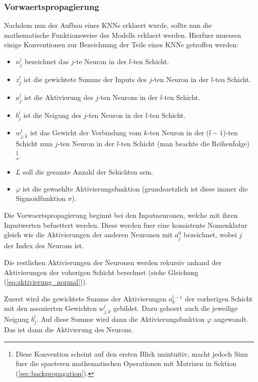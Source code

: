 \documentclass[../main]{subfiles}
\begin{document}
\subsubsection{Vorwaertspropagierung}
Nachdem nun der Aufbau eines KNNs erklaert wurde, sollte nun die mathematische Funktionsweise
des Modells erklaert werden. Hierfuer muessen einige Konventionen zur
Bezeichnung der Teile eines KNNs getroffen werden:
\begin{itemize}

\item{$n_j^l$ bezeichnet das $j$-te Neuron in der $l$-ten Schicht.}
\item{$z_j^l$ ist die gewichtete Summe der Inputs des $j$-ten Neuron in der $l$-ten Schicht.}
\item{$a_j^l$ ist die Aktivierung des $j$-ten Neurons in der $l$-ten Schicht.}
\item{$b_j^l$ ist die Neigung des $j$-ten Neuron in der $l$-ten Schicht.}
\item{$w_{j,k}^l$ ist das Gewicht der Verbindung vom $k$-ten Neuron
    in der ($l-1$)-ten Schicht zum $j$-ten Neuron in der $l$-ten Schicht (man
    beachte die Reihenfolge)
    \footnote{
      Diese Konvention scheint auf den ersten Blick unintuitiv, macht jedoch
      Sinn fuer die spaeteren mathematischen Operationen mit Matrizen in Sektion
      (\ref{sec:backpropagation}).
    }.}

\item{$L$ soll die gesamte Anzahl der Schichten sein.}

\item{$\varphi$ ist die gewaehlte Aktivierungsfunktion (grundsaetzlich ist diese
    immer die Sigmoidfunktion $\sigma$).}

\end{itemize}
\par\bigskip
Die Vorwaertspropagierung beginnt bei den Inputneuronen, welche mit ihren
Inputwerten befuettert werden. Diese werden fuer eine konsistente Nomenklatur
gleich wie die Aktivierungen der anderen Neuronen mit $a_j^0$ bezeichnet, wobei
$j$ der Index des Neurons ist.\par
Die restlichen Aktivierungen der Neuronen werden rekursiv anhand der
Aktivierungen der voherigen Schicht berechnet (siehe Gleichung
(\ref{eq:aktivierung_normal})).\par
Zuerst wird die gewichtete Summe der Aktivierungen $a_k^{l-1}$ der vorherigen Schicht
mit den assozierten Gewichten $w_{j,k}^l$ gebildet. Dazu gehoert
auch die jeweilige Neigung $b_j^l$. Auf diese Summe wird dann die
Aktivierungsfunktion $\varphi$ angewandt. Das ist dann die Aktivierung des Neurons.
\end{document}
